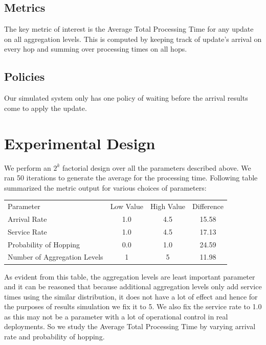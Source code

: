 \documentclass[conference]{IEEEtran}
\begin{document}
\subsection{Metrics}
The key metric of interest is the Average Total Processing Time for any update on all aggregation levels. This is computed by keeping track of update's arrival on every hop and summing over processing times on all hops.

\subsection{Policies}
Our simulated system only has one policy of waiting before the arrival results come to apply the update. 

\section{Experimental Design}
We perform an $2^k$ factorial design over all the parameters described above. We ran 50 iterations to generate the average for the processing time. Following table summarized the metric output for various choices of parameters:

\begin{table}[h]

\begin{tabular}{ l c c c}
  Parameter & Low Value & High Value & Difference \\
  Arrival Rate & 1.0 & 4.5 & 15.58 \\
  Service Rate & 1.0 & 4.5 & 17.13 \\
  Probability of Hopping  & 0.0 & 1.0 & 24.59 \\
  Number of Aggregation Levels  & 1 & 5 & 11.98 \\
  \end{tabular}
  
\end{table}

As evident from this table, the aggregation levels are least important parameter and it can be reasoned that because additional aggregation levels only add service times using the similar distribution, it does not have a lot of effect and hence for the purposes of results  simulation we fix it to 5.  We also fix the service rate to 1.0 as this may not be a parameter with a lot of operational control in real deployments. So we study the Average Total Processing Time by varying arrival rate and probability of hopping.
\end{document}
